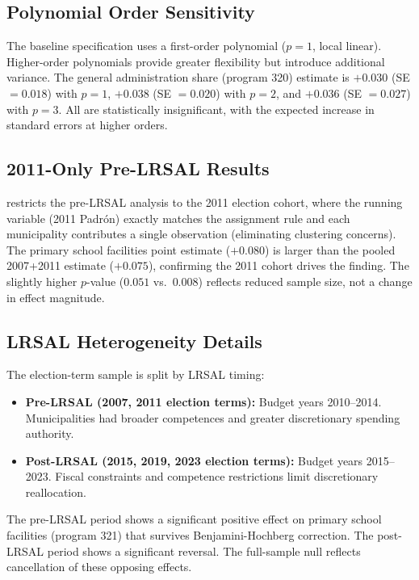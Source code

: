 \documentclass[12pt]{article}
\begin{document}


\subsection{Polynomial Order Sensitivity}

The baseline specification uses a first-order polynomial ($p=1$, local linear). Higher-order polynomials provide greater flexibility but introduce additional variance. The general administration share (program 320) estimate is $+0.030$ (SE $= 0.018$) with $p = 1$, $+0.038$ (SE $= 0.020$) with $p = 2$, and $+0.036$ (SE $= 0.027$) with $p = 3$. All are statistically insignificant, with the expected increase in standard errors at higher orders.

\subsection{2011-Only Pre-LRSAL Results}

 restricts the pre-LRSAL analysis to the 2011 election cohort, where the running variable (2011 Padr\'{o}n) exactly matches the assignment rule and each municipality contributes a single observation (eliminating clustering concerns). The primary school facilities point estimate ($+0.080$) is larger than the pooled 2007+2011 estimate ($+0.075$), confirming the 2011 cohort drives the finding. The slightly higher $p$-value ($0.051$ vs.\ $0.008$) reflects reduced sample size, not a change in effect magnitude.



\subsection{LRSAL Heterogeneity Details}

The election-term sample is split by LRSAL timing:

\begin{itemize}
    \item \textbf{Pre-LRSAL (2007, 2011 election terms):} Budget years 2010--2014. Municipalities had broader competences and greater discretionary spending authority.
    \item \textbf{Post-LRSAL (2015, 2019, 2023 election terms):} Budget years 2015--2023. Fiscal constraints and competence restrictions limit discretionary reallocation.
\end{itemize}

The pre-LRSAL period shows a significant positive effect on primary school facilities (program 321) that survives Benjamini-Hochberg correction. The post-LRSAL period shows a significant reversal. The full-sample null reflects cancellation of these opposing effects.
\end{document}
